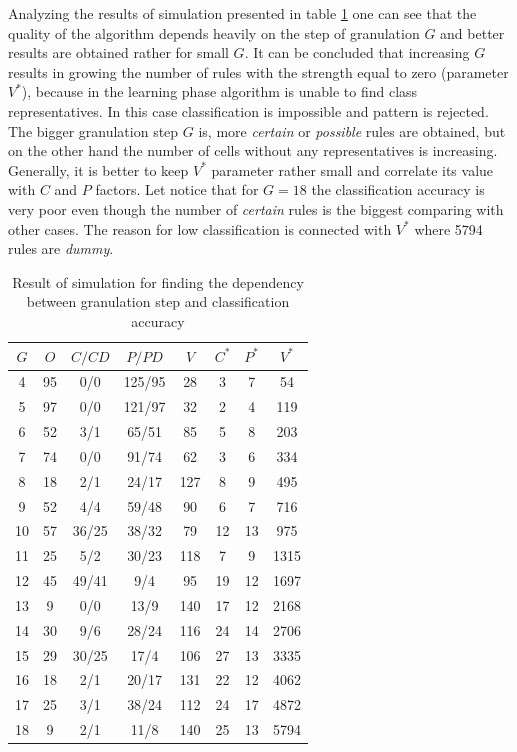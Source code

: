 Analyzing the results of simulation presented in table \ref{tab:simulation_research_1}
one can see that the quality of the algorithm depends heavily on the step of
granulation $G$ and better results are obtained rather for small $G$.
It can be concluded that increasing $G$ results in growing the number of rules
with the strength equal to zero (parameter $V^*$), because in the learning phase
algorithm is unable to find class representatives. In this case classification is 
impossible and pattern is rejected. The bigger granulation step $G$ is, more
\textit{certain} or \textit{possible} rules are obtained, but on the other hand
the number of cells without any representatives is increasing. Generally, it is
better to keep $V^*$ parameter rather small and correlate its value with $C$
and $P$ factors. Let notice that for $G=18$ the classification accuracy is very
poor even though the number of \textit{certain} rules is the biggest comparing with other
cases. The reason for low classification is connected with $V^*$ where 5794
rules are \textit{dummy}.

\begin{table}[H]
    \caption{Result of simulation for finding the dependency between
    granulation step and classification accuracy}
    \centering
    \begin{tabular}{|c|c|c|c|c|c|c|c|}
        \hline
        $G$ & $O$ & $C/CD$ & $P/PD$ & $V$ & $C^*$ & $P^*$ & $V^*$ \\ \hline \hline
        4&95&0/0&125/95&28&3&7&54 \\ \hline
        5&97&0/0&121/97&32&2&4&119 \\\hline
        6&52&3/1&65/51&85&5&8&203 \\ \hline
        7&74&0/0&91/74&62&3&6&334 \\ \hline
        8&18&2/1&24/17&127&8&9&495 \\ \hline
        9&52&4/4&59/48&90&6&7&716 \\ \hline
        10&57&36/25&38/32&79&12&13&975 \\ \hline
        11&25&5/2&30/23&118&7&9&1315 \\ \hline
        12&45&49/41&9/4&95&19&12&1697 \\ \hline
        13&9&0/0&13/9&140&17&12&2168 \\ \hline
        14&30&9/6&28/24&116&24&14&2706 \\ \hline
        15&29&30/25&17/4&106&27&13&3335 \\ \hline
        16&18&2/1&20/17&131&22&12&4062 \\ \hline
        17&25&3/1&38/24&112&24&17&4872 \\ \hline
        18&9&2/1&11/8&140&25&13&5794 \\ \hline
    \end{tabular}
    \label{tab:simulation_research_1}
\end{table}

